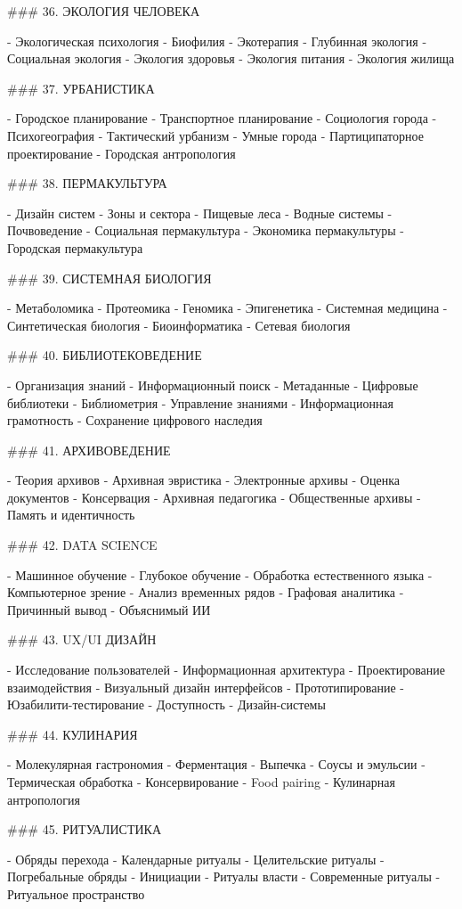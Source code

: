 ### 36. ЭКОЛОГИЯ ЧЕЛОВЕКА

- Экологическая психология
- Биофилия
- Экотерапия
- Глубинная экология
- Социальная экология
- Экология здоровья
- Экология питания
- Экология жилища

### 37. УРБАНИСТИКА

- Городское планирование
- Транспортное планирование
- Социология города
- Психогеография
- Тактический урбанизм
- Умные города
- Партиципаторное проектирование
- Городская антропология

### 38. ПЕРМАКУЛЬТУРА

- Дизайн систем
- Зоны и сектора
- Пищевые леса
- Водные системы
- Почвоведение
- Социальная пермакультура
- Экономика пермакультуры
- Городская пермакультура

### 39. СИСТЕМНАЯ БИОЛОГИЯ

- Метаболомика
- Протеомика
- Геномика
- Эпигенетика
- Системная медицина
- Синтетическая биология
- Биоинформатика
- Сетевая биология

### 40. БИБЛИОТЕКОВЕДЕНИЕ

- Организация знаний
- Информационный поиск
- Метаданные
- Цифровые библиотеки
- Библиометрия
- Управление знаниями
- Информационная грамотность
- Сохранение цифрового наследия

### 41. АРХИВОВЕДЕНИЕ

- Теория архивов
- Архивная эвристика
- Электронные архивы
- Оценка документов
- Консервация
- Архивная педагогика
- Общественные архивы
- Память и идентичность

### 42. DATA SCIENCE

- Машинное обучение
- Глубокое обучение
- Обработка естественного языка
- Компьютерное зрение
- Анализ временных рядов
- Графовая аналитика
- Причинный вывод
- Объяснимый ИИ

### 43. UX/UI ДИЗАЙН

- Исследование пользователей
- Информационная архитектура
- Проектирование взаимодействия
- Визуальный дизайн интерфейсов
- Прототипирование
- Юзабилити-тестирование
- Доступность
- Дизайн-системы

### 44. КУЛИНАРИЯ

- Молекулярная гастрономия
- Ферментация
- Выпечка
- Соусы и эмульсии
- Термическая обработка
- Консервирование
- Food pairing
- Кулинарная антропология

### 45. РИТУАЛИСТИКА

- Обряды перехода
- Календарные ритуалы
- Целительские ритуалы
- Погребальные обряды
- Инициации
- Ритуалы власти
- Современные ритуалы
- Ритуальное пространство

